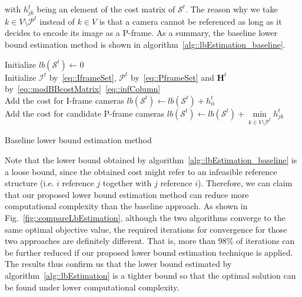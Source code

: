 with $h_{jk}^t$ being an element of the cost matrix of $\mathcal{S}^t$.
The reason why we take $k \in V \setminus \mathcal{P}^t$ instead of $k \in V$ is that a camera cannot be referenced as long as it decides to encode its image as a P-frame.
As a summary, the baseline lower bound estimation method is shown in algorithm~\ref{alg::lbEstimation_baseline}.
%
\IncMargin{1em}
\begin{algorithm}[]
 \SetAlgoLined
 \BlankLine
 Initialize $lb(\mathcal{S}^t) \gets 0$\\
 Initialize $\mathcal{I}^t$ by~\eqref{eq::IframeSet}, $\mathcal{P}^t$ by~\eqref{eq::PframeSet} and $\mathbf{H}^t$ by~\eqref{eq::modBBcostMatrix}~\eqref{eq::infColumn} \\
 {
 	Add the cost for I-frame cameras $lb(\mathcal{S}^t) \gets lb(\mathcal{S}^t) + h_{ii}^t$ \\
 }
 {
 	Add the cost for candidate P-frame cameras $lb(\mathcal{S}^t) \gets lb(\mathcal{S}^t) + \underset{k \in V \setminus \mathcal{P}^t}{\min} h_{jk}^t$ \\
 }
 \caption{\label{alg::lbEstimation_baseline}Baseline lower bound estimation method}
\end{algorithm}
\DecMargin{1em}
%

Note that the lower bound obtained by algorithm~\ref{alg::lbEstimation_baseline} is a loose bound, since the obtained cost might refer to an infeasible reference structure (i.e. $i$ reference $j$ together with $j$ reference $i$).
Therefore, we can claim that our proposed lower bound estimation method can reduce more computational complexity than the baseline approach.
As shown in Fig.~\ref{fig::compareLbEstimation}, although the two algorithms converge to the same optimal objective value, the required iterations for convergence for those two approaches are definitely different.
That is, more than $98\%$ of iterations can be further reduced if our proposed lower bound estimation technique is applied.
The results thus confirm us that the lower bound estimated by algorithm~\ref{alg::lbEstimation} is a tighter bound so that the optimal solution can be found under lower computational complexity.


